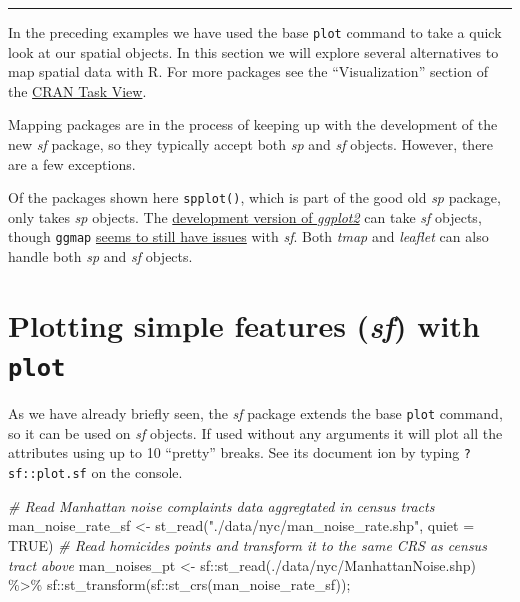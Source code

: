 \documentclass[
  11pt,
]{book}
\newenvironment{Shaded}{\begin{snugshade}}{\end{snugshade}}
\newcommand{\AttributeTok}[1]{\textcolor[rgb]{0.77,0.63,0.00}{#1}}
\newcommand{\CommentTok}[1]{\textcolor[rgb]{0.56,0.35,0.01}{\textit{#1}}}
\newcommand{\ConstantTok}[1]{\textcolor[rgb]{0.00,0.00,0.00}{#1}}
\newcommand{\FunctionTok}[1]{\textcolor[rgb]{0.00,0.00,0.00}{#1}}
\newcommand{\NormalTok}[1]{#1}
\newcommand{\OtherTok}[1]{\textcolor[rgb]{0.56,0.35,0.01}{#1}}
\newcommand{\SpecialCharTok}[1]{\textcolor[rgb]{0.00,0.00,0.00}{#1}}
\newcommand{\StringTok}[1]{\textcolor[rgb]{0.31,0.60,0.02}{#1}}
\begin{document}
\begin{center}\rule{0.5\linewidth}{0.5pt}\end{center}

In the preceding examples we have used the base \texttt{plot} command to take a quick look at our spatial objects. In this section we will explore several alternatives to map spatial data with R. For more packages see the ``Visualization'' section of the \href{https://cran.r-project.org/web/views/Spatial.html}{CRAN Task View}.

Mapping packages are in the process of keeping up with the development of the new \emph{sf} package, so they typically accept both \emph{sp} and \emph{sf} objects. However, there are a few exceptions.

Of the packages shown here \texttt{spplot()}, which is part of the good old \emph{sp} package, only takes \emph{sp} objects. The \href{https://github.com/tidyverse/ggplot2/releases}{development version of \emph{ggplot2}} can take \emph{sf} objects, though \texttt{ggmap} \href{https://github.com/tidyverse/ggplot2/issues/2130}{seems to still have issues} with \emph{sf}. Both \emph{tmap} and \emph{leaflet} can also handle both \emph{sp} and \emph{sf} objects.

\hypertarget{plotting-simple-features-sf-with-plot}{%
\section{\texorpdfstring{Plotting simple features (\emph{sf}) with \texttt{plot}}{Plotting simple features (sf) with plot}}\label{plotting-simple-features-sf-with-plot}}

As we have already briefly seen, the \emph{sf} package extends the base \texttt{plot} command, so it can be used on \emph{sf} objects. If used without any arguments it will plot all the attributes using up to 10 ``pretty'' breaks. See its document ion by typing \texttt{?sf::plot.sf} on the console.

\begin{Shaded}
\begin{Highlighting}[]
\CommentTok{\# Read Manhattan noise complaints data aggregtated in census tracts}
\NormalTok{man\_noise\_rate\_sf }\OtherTok{\textless{}{-}}  \FunctionTok{st\_read}\NormalTok{(}\StringTok{"./data/nyc/man\_noise\_rate.shp"}\NormalTok{, }\AttributeTok{quiet =} \ConstantTok{TRUE}\NormalTok{)}
\CommentTok{\# Read homicides points and transform it to the same CRS as census tract above}
\NormalTok{man\_noises\_pt }\OtherTok{\textless{}{-}}\NormalTok{ sf}\SpecialCharTok{::}\FunctionTok{st\_read}\NormalTok{(}\StringTok{\textquotesingle{}./data/nyc/ManhattanNoise.shp\textquotesingle{}}\NormalTok{) }\SpecialCharTok{\%\textgreater{}\%}
\NormalTok{  sf}\SpecialCharTok{::}\FunctionTok{st\_transform}\NormalTok{(sf}\SpecialCharTok{::}\FunctionTok{st\_crs}\NormalTok{(man\_noise\_rate\_sf));}
\end{Highlighting}
\end{Shaded}
\end{document}
